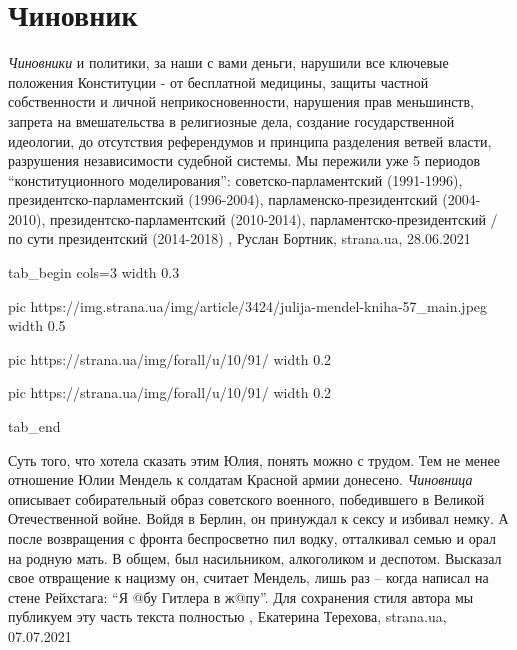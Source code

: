  
 
 
 
 
\chapter{Чиновник}
\label{sec:slova.chinovnik}

\emph{Чиновники} и политики, за наши с вами деньги, нарушили все ключевые положения
Конституции - от бесплатной медицины, защиты частной собственности и личной
неприкосновенности, нарушения прав меньшинств, запрета на вмешательства в
религиозные дела, создание государственной идеологии, до отсутствия
референдумов и принципа разделения ветвей власти, разрушения независимости
судебной системы.  Мы пережили уже 5 периодов \enquote{конституционного моделирования}:
советско-парламентский (1991-1996), президентско-парламентский (1996-2004),
парламенско-президентский (2004-2010), президентско-парламентский (2010-2014),
парламентско-президентский / по сути президентский (2014-2018)
, 
Руслан Бортник, strana.ua, 28.06.2021


\ifcmt
  tab_begin cols=3
     width 0.3

     pic https://img.strana.ua/img/article/3424/julija-mendel-kniha-57_main.jpeg
     width 0.5

     pic https://strana.ua/img/forall/u/10/91/%
     width 0.2

     pic https://strana.ua/img/forall/u/10/91/%
     width 0.2

  tab_end
\fi

Суть того, что хотела сказать этим Юлия, понять можно с трудом.
Тем не менее отношение Юлии Мендель к солдатам Красной армии донесено.
\emph{Чиновница} описывает собирательный образ советского военного, победившего в
Великой Отечественной войне. Войдя в Берлин, он принуждал к сексу и избивал
немку. А после возвращения с фронта беспросветно пил водку, отталкивал семью и
орал на родную мать. В общем, был насильником, алкоголиком и деспотом. Высказал
свое отвращение к нацизму он, считает Мендель, лишь раз – когда написал на
стене Рейхстага: \enquote{Я @бу Гитлера в ж@пу}.
Для сохранения стиля автора мы публикуем эту часть текста полностью
, 
Екатерина Терехова, strana.ua, 07.07.2021

